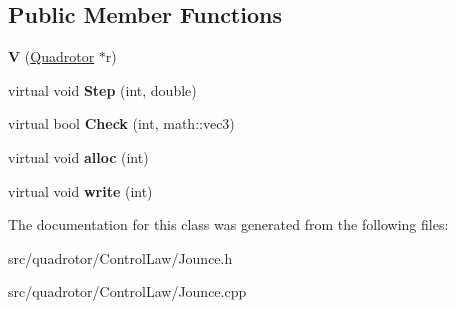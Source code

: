 \subsection*{\-Public \-Member \-Functions}
\begin{DoxyCompactItemize}
\item 
\hypertarget{classJounce_1_1V_a1cb67cc154796091ff5b571b0cafa184}{{\bfseries \-V} (\hyperlink{classQuadrotor}{\-Quadrotor} $\ast$r)}\label{classJounce_1_1V_a1cb67cc154796091ff5b571b0cafa184}

\item 
\hypertarget{classJounce_1_1V_a51b032ee7b0f6bf93f28c764ea117c11}{virtual void {\bfseries \-Step} (int, double)}\label{classJounce_1_1V_a51b032ee7b0f6bf93f28c764ea117c11}

\item 
\hypertarget{classJounce_1_1V_a504f05fe2b80328d863eacddfb15b555}{virtual bool {\bfseries \-Check} (int, math\-::vec3)}\label{classJounce_1_1V_a504f05fe2b80328d863eacddfb15b555}

\item 
\hypertarget{classJounce_1_1V_af93b8cc4b4609e4b4ee04a635656a0da}{virtual void {\bfseries alloc} (int)}\label{classJounce_1_1V_af93b8cc4b4609e4b4ee04a635656a0da}

\item 
\hypertarget{classJounce_1_1V_a25a4b61e80beb56af2a9ad1fc5a1d270}{virtual void {\bfseries write} (int)}\label{classJounce_1_1V_a25a4b61e80beb56af2a9ad1fc5a1d270}

\end{DoxyCompactItemize}


\-The documentation for this class was generated from the following files\-:\begin{DoxyCompactItemize}
\item 
src/quadrotor/\-Control\-Law/\-Jounce.\-h\item 
src/quadrotor/\-Control\-Law/\-Jounce.\-cpp\end{DoxyCompactItemize}
